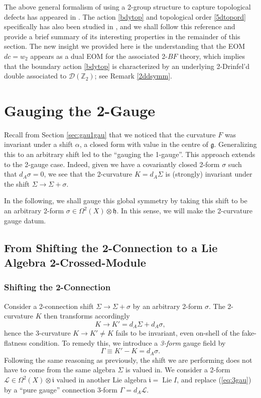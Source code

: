 \documentclass[onecolumn]{article}
\theoremstyle{theorem}
\theoremstyle{remark}
\theoremstyle{example}
\theoremstyle{definition}
\numberwithin{equation}{section}
\def\g{\mathfrak g}
\def\h{\mathfrak h}
\def\bbZ{\mathbb{Z}}
\begin{document}
The above general formalism of using a 2-group structure to capture topological defects has appeared in \cite{Kapustin:2013uxa,Zhu:2019}. The action  \eqref{bdytop} and topological order \eqref{5dtopord} specifically has also been studied in \cite{Thorngren2015}, and we shall follow this reference and provide a brief summary of its interesting properties in the remainder of this section. {{The new insight we provided here}}  is the understanding that the EOM $dc=w_2$ appears as a {{dual}} EOM for the associated 2-$BF$ theory, which implies that the boundary action  \eqref{bdytop} is characterized by an underlying 2-Drinfel'd double associated to $\mathcal{D}(\bbZ_2)$; see { {Remark} \ref{2ddsymm}}.





\section{Gauging the 2-Gauge}\label{sec:gaug2gau}
Recall from Section \ref{sec:gau1gau} that we noticed that the curvature $F$ was invariant under a shift $\alpha$, a closed form  with value in the centre of $\g$. Generalizing this to an arbitrary shift led to the  ``gauging the 1-gauge''. This approach extends to the 2-gauge case.   Indeed, given we have a covariantly closed 2-form $\sigma$ such that $d_A\sigma=0$, we see that the 2-curvature $K=d_A\Sigma$ is (strongly) invariant under the shift $\Sigma\rightarrow \Sigma+\sigma$. 

In the following, we shall gauge this global symmetry by taking this shift to be an {{arbitrary}} 2-form $\sigma\in\Omega^2(X)\otimes\h$. In this sense, we will make the 2-curvature {{gauge datum}}. 

\subsection{From Shifting the 2-Connection to a Lie Algebra 2-Crossed-Module}\label{sec:2-con-shift}


\subsubsection{Shifting the 2-Connection}
Consider a 2-connection shift $\Sigma\rightarrow \Sigma+\sigma$ by an arbitrary 2-form $\sigma$. The 2-curvature $K$ then transforms accordingly
\begin{equation}
    K \rightarrow K'=d_A\Sigma + d_A\sigma,\nonumber
\end{equation}
hence the 3-curvature $K\rightarrow K'\neq K$ fails to be invariant, even on-shell of the fake-flatness condition. To remedy this, we introduce a {\it {3-form}} gauge field by
\begin{equation}
    \Gamma\equiv K'-K = d_A\sigma.\label{eq:3gau}
\end{equation}
{Following} the same reasoning as previously, the shift we are performing does not have to come from the same algebra $\Sigma$ is valued in. We consider a 2-form $\mathcal{L}\in\Omega^2(X)\otimes\mathfrak{i}$ valued in another Lie algebra $\mathfrak{i}=\operatorname{Lie}I$, and replace (\ref{eq:3gau}) by a ``pure gauge'' connection  3-form $\Gamma=d_A\mathcal{L}$. 
\end{document}

